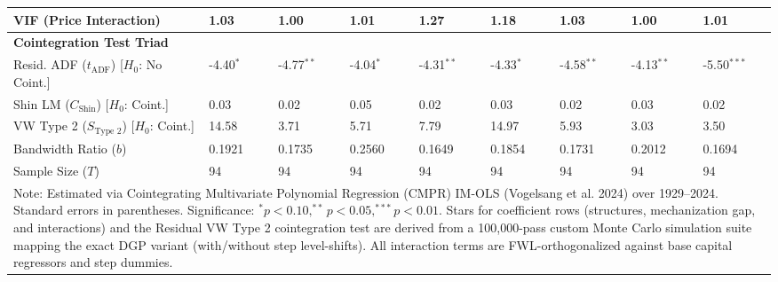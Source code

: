\begin{table}[H]
\begin{tabular}{p{3.8cm}p{1.1cm}p{1.1cm}p{1.1cm}p{1.1cm}p{1.1cm}p{1.1cm}p{1.1cm}p{1.1cm}}
VIF (Price Interaction) & 1.03 & 1.00 & 1.01 & 1.27 & 1.18 & 1.03 & 1.00 & 1.01 \\
\midrule
\multicolumn{9}{l}{\textbf{Cointegration Test Triad}} \\
Resid. ADF ($t_{\text{ADF}}$) [$H_0$: No Coint.] & -4.40$^{*}$ & -4.77$^{**}$ & -4.04$^{*}$ & -4.31$^{**}$ & -4.33$^{*}$ & -4.58$^{**}$ & -4.13$^{**}$ & -5.50$^{***}$ \\
Shin LM ($C_{\text{Shin}}$) [$H_0$: Coint.] & 0.03 & 0.02 & 0.05 & 0.02 & 0.03 & 0.02 & 0.03 & 0.02 \\
VW Type 2 ($S_{\text{Type 2}}$) [$H_0$: Coint.] & 14.58 & 3.71 & 5.71 & 7.79 & 14.97 & 5.93 & 3.03 & 3.50 \\
\midrule
Bandwidth Ratio ($b$) & 0.1921 & 0.1735 & 0.2560 & 0.1649 & 0.1854 & 0.1731 & 0.2012 & 0.1694 \\
Sample Size ($T$) & 94 & 94 & 94 & 94 & 94 & 94 & 94 & 94 \\
\bottomrule
\multicolumn{9}{p{15cm}}{\footnotesize Note: Estimated via Cointegrating Multivariate Polynomial Regression (CMPR) IM-OLS (Vogelsang et al. 2024) over 1929--2024. Standard errors in parentheses. Significance: $^* p < 0.10, ^{**} p < 0.05, ^{***} p < 0.01$. Stars for coefficient rows (structures, mechanization gap, and interactions) and the Residual VW Type 2 cointegration test are derived from a 100,000-pass custom Monte Carlo simulation suite mapping the exact DGP variant (with/without step level-shifts). All interaction terms are FWL-orthogonalized against base capital regressors and step dummies.}
\end{tabular}
\end{table}
